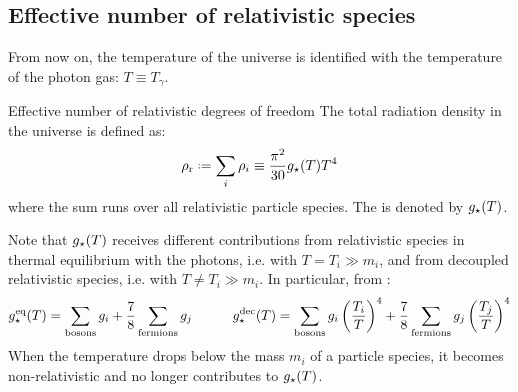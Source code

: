 \subsection{Effective number of relativistic species}

From now on, the temperature of the universe is identified with the temperature of the photon gas: $ T \equiv T_\gamma $.

\begin{definition}{Effective number of relativistic degrees of freedom}{}
  The total radiation density in the universe is defined as:
  \begin{equation}
    \rho_\text{r} \defeq \sum_i \rho_i \equiv \frac{\pi^2}{30} \dof(T) T^4
    \label{eq:rad-en-dens-def}
  \end{equation}
  where the sum runs over all relativistic particle species. The  is denoted by $ g_\star(T) $.
\end{definition}

Note that $ g_\star(T) $ receives different contributions from relativistic species in thermal equilibrium with the photons, i.e. with $ T = T_i \gg m_i $, and from decoupled relativistic species, i.e. with $ T \neq T_i \gg m_i $. In particular, from :
\begin{equation}
  g_\star^\text{eq}(T) = \sum_\text{bosons} g_i + \frac{7}{8} \sum_\text{fermions} g_j
  \qquad \quad
  g_\star^\text{dec}(T) = \sum_\text{bosons} g_i \left( \frac{T_i}{T} \right)^4 + \frac{7}{8} \sum_\text{fermions} g_j \left( \frac{T_j}{T} \right)^4
\end{equation}
When the temperature drops below the mass $ m_i $ of a particle species, it becomes non-relativistic and no longer contributes to $ g_\star(T) $.

